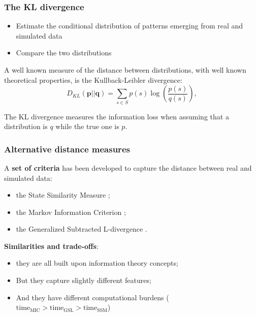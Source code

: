 \documentclass[10pt]{beamer}
\begin{document}
\begin{frame}[c]\frametitle{The KL divergence}
	\begin{itemize}
		\item Estimate the conditional distribution of patterns emerging from real and simulated  data
		\item Compare the two distributions
	\end{itemize}

	A well known measure of the distance between distributions, with well known theoretical properties, is the Kullback-Leibler divergence:
	\begin{equation}
		D_{KL}(\textbf{p}||\textbf{q})=\sum_{s \in \textit{S} }p(s)\log\left(\frac{p(s)}{q(s)}\right),
	\end{equation} 

	The KL divergence measures the information loss when assuming that a distribution is $q$ while the true one is $p$.
\end{frame}

\begin{frame}[c]\frametitle{Alternative distance measures}
	A \alert{\textbf{set of criteria}} has been developed to capture the distance between real and simulated data:
	\begin{itemize}
		\item the State Similarity Measure \citep[SSM --][]{marks2013validation};
		\item the Markov Information Criterion \citep[MIC --][]{barde2017practical, barde2020comparison};
		\item the Generalized Subtracted L-divergence \citep[GSL-div --][]{lamperti2018gsl, lamperti2018empirical}.
	\end{itemize}
	\smallskip
	
	\alert{\textbf{Similarities and trade-offs}:}
	\begin{itemize}
		\item they are all built upon information theory concepts;
		\item But they capture slightly different features;
		\item And they have different computational burdens ($\text{time}_{\text{MIC}}>\text{time}_{\text{GSL}}>\text{time}_{\text{SSM}}$)
	\end{itemize}
\end{frame}
\end{document}
